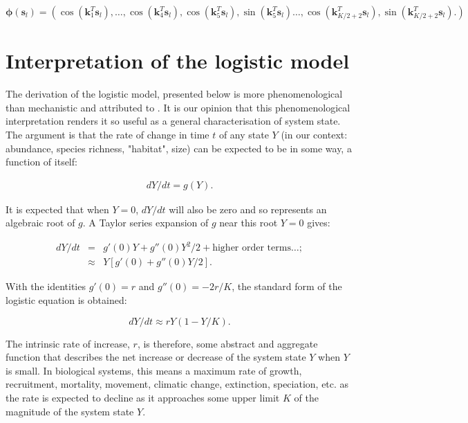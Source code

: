 \documentclass[letterpaper,portrait,11pt]{scrartcl}
\numberwithin{equation}{section}    %
\numberwithin{figure}{section}    %
\numberwithin{table}{section}       %
\begin{document}
\begin{appendices}
 \[
 \bm{\phi}(\bm{s}_l) = ( \cos(\bm{k}^T_1\bm{s}_l),  \dots , \cos(\bm{k}^T_4\bm{s}_l), 
   \cos(\bm{k}^T_5\bm{s}_l), \sin(\bm{k}^T_5\bm{s}_l)\dots, 
   \cos(\bm{k}^T_{K/2+2}\bm{s}_l), \sin(\bm{k}^T_{K/2+2}\bm{s}_l).
 ) 
 \]


\section{Interpretation of the logistic model}
\label{sec:logisticModel}

The derivation of the logistic model, presented below is more phenomenological than mechanistic and attributed to \textcite{lotka1925}. It is our opinion that this phenomenological interpretation renders it so useful as a general characterisation of system state. The argument is that the rate of change in time $t$ of any state $Y$ (in our context: abundance, species richness, "habitat", size) can be expected to be in some way, a function of itself:  

\begin{eqnarray} 
\label{eqLogisticContinuous}
dY / dt = g(Y).
\end{eqnarray}

It is expected that when $Y = 0$, $dY/dt$ will also be zero and so represents an algebraic root of $g$. A Taylor series expansion of $g$ near this root $Y=0$ gives:

\begin{eqnarray*} 
  \label{eqLogisticTaylorSeries}
  dY / dt &=&  g'(0) Y + g''(0) Y^{2}/2  + \text{higher order terms} \dots; \\
  &\approx& Y [g'(0) + g''(0) Y/2  ].
\end{eqnarray*}


With the identities $g'(0) = r$  and $g''(0) = - 2r/K$, the standard form of the logistic equation is obtained:

\begin{equation} 
\label{eqLogistic}
dY/dt \approx r Y (1 - Y/K).
\end{equation}

The intrinsic rate of increase, $r$, is therefore, some abstract and aggregate function that describes the net increase or decrease of the system state $Y$ when $Y$ is small. In biological systems, this means a maximum rate of growth, recruitment, mortality, movement, climatic change, extinction, speciation, etc. as the rate is expected to decline as it approaches some upper limit $K$ of the magnitude of the system state $Y$.


\end{appendices}
\end{document}
